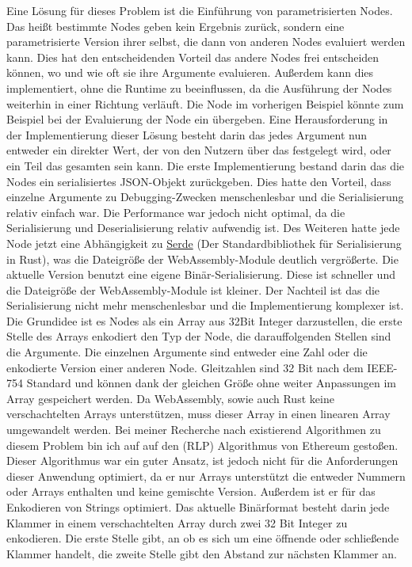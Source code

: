 \documentclass[ngerman]{article}
\begin{document}
Eine Lösung für dieses Problem ist die Einführung von parametrisierten Nodes. Das heißt bestimmte Nodes geben kein Ergebnis zurück, sondern eine parametrisierte Version ihrer selbst, die dann von anderen Nodes evaluiert werden kann.
\br
Dies hat den entscheidenden Vorteil das andere Nodes frei entscheiden können, wo und wie oft sie ihre Argumente evaluieren.
Außerdem kann dies implementiert, ohne die Runtime zu beeinflussen, da die Ausführung der Nodes weiterhin in einer Richtung verläuft.
\br
Die  Node im vorherigen Beispiel könnte zum Beispiel bei der Evaluierung der  Node ein  übergeben.
\br
Eine Herausforderung in der Implementierung dieser Lösung besteht darin das jedes Argument nun entweder ein direkter Wert, der von den Nutzern über das  festgelegt wird, oder ein Teil das gesamten  sein kann.
\br
Die erste Implementierung bestand darin das die Nodes ein serialisiertes JSON-Objekt zurückgeben. Dies hatte den Vorteil, dass einzelne Argumente zu Debugging-Zwecken menschenlesbar und die Serialisierung relativ einfach war. Die Performance war jedoch nicht optimal, da die Serialisierung und Deserialisierung relativ aufwendig ist. Des Weiteren hatte jede Node jetzt eine Abhängigkeit zu \href{ https://serde.rs/ }{Serde} (Der Standardbibliothek für Serialisierung in Rust), was die Dateigröße der WebAssembly-Module deutlich vergrößerte.
\br
Die aktuelle Version benutzt eine eigene Binär-Serialisierung. Diese ist schneller und die Dateigröße der WebAssembly-Module ist kleiner. Der Nachteil ist das die Serialisierung nicht mehr menschenlesbar und die Implementierung komplexer ist. 
\br
Die Grundidee ist es Nodes als ein Array aus 32Bit Integer darzustellen, die erste Stelle des Arrays enkodiert den Typ der Node, die darauffolgenden Stellen sind die Argumente. Die einzelnen Argumente sind entweder eine Zahl oder die enkodierte Version einer anderen Node.
Gleitzahlen sind 32 Bit nach dem IEEE-754 Standard und können dank der gleichen Größe ohne weiter Anpassungen im Array gespeichert werden. 
\br
Da WebAssembly, sowie auch Rust keine verschachtelten Arrays unterstützen, muss dieser Array in einen linearen Array umgewandelt werden. 
Bei meiner Recherche nach existierend Algorithmen zu diesem Problem bin ich auf auf den  (RLP) Algorithmus von Ethereum gestoßen. Dieser Algorithmus war ein guter Ansatz, ist jedoch nicht für die Anforderungen dieser Anwendung optimiert, da er nur Arrays unterstützt die entweder Nummern oder Arrays enthalten und keine gemischte Version. Außerdem ist er für das Enkodieren von Strings optimiert.
\cite{wood2024ethereum}
\br
Das aktuelle Binärformat besteht darin jede Klammer in einem verschachtelten Array durch zwei 32 Bit Integer zu enkodieren. 
Die erste Stelle gibt, an ob es sich um eine öffnende oder schließende Klammer handelt, die zweite Stelle gibt den Abstand zur nächsten Klammer an.
\end{document}
